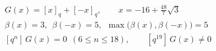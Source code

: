 \documentclass{article}
\begin{document}
\[
\begin{aligned}
&G(x)=[x]_q+[-x]_q,\qquad x=-16+\tfrac{48}{7}\sqrt3\\
&\beta(x)=3,\ \ \beta(-x)=5,\ \ \max\bigl(\beta(x),\beta(-x)\bigr)=5\\
&[q^{n}]\,G(x)=0\ \ (6\le n\le18),\qquad [q^{19}]\,G(x)\neq0
\end{aligned}
\]
\end{document}
